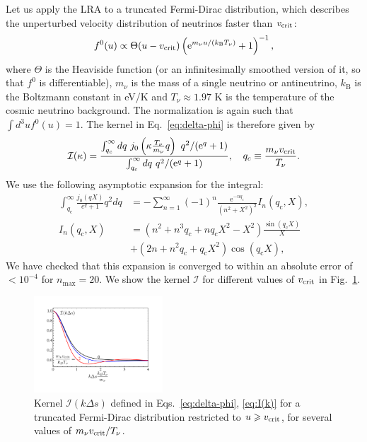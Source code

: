 \documentclass[useAMS, usenatbib]{mnras}
\newcommand{\barr}{\begin{eqnarray}}
\newcommand{\earr}{\end{eqnarray}}
\newcommand{\rme}{\textrm{e}}
\begin{document}
Let us apply the LRA to a truncated Fermi-Dirac distribution, which describes the unperturbed velocity distribution of neutrinos faster than $v_{\rm crit}$:
\begin{equation}
f^0(u) \propto \Theta(u - v_{\rm crit}) \left(\rme^{m_\nu u/ \left(k_\mathrm{B} T_\nu\right)} + 1 \right)^{-1},
\end{equation}
where $\Theta$ is the Heaviside function (or an infinitesimally smoothed version of it, so that $f^0$ is differentiable), $m_\nu$ is the mass of a single neutrino or antineutrino, $k_\mathrm{B}$ is the Boltzmann constant in eV/K and $T_\nu \approx 1.97$ K is the temperature of the cosmic neutrino background. The normalization is again such that $\int d^3 u f^0(u) = 1$. The kernel in Eq.~\eqref{eq:delta-phi} is therefore given by
\barr
\mathcal{I}(\kappa) = \frac{\int_{q_c}^{\infty} dq~ j_0\left(\kappa \frac{T_\nu}{m_\nu}q\right)~ q^2 /(\rme^q + 1) }{\int_{q_c}^{\infty} dq ~q^2/(\rme^q + 1)}, \ \ \ q_c \equiv \frac{m_\nu v_{\rm crit}}{T_\nu}.
\earr
We use the following asymptotic expansion for the integral:
\begin{align}
 \int^\infty_{q_\mathrm{c}} \frac{j_0(qX)}{e^q + 1} q^2 dq &= - \sum^{\infty}_{n=1} (-1)^n \frac{\rme^{-n q_\mathrm{c}}}{(n^2+X^2)^2} I_n(q_\mathrm{c},X),\\
 I_n(q_\mathrm{c},X) &= \left(n^2 + n^3 q_\mathrm{c} + n q_\mathrm{c} X^2 - X^2\right) \frac{\sin(q_\mathrm{c} X)}{X} \nonumber \\
 &+ \left(2n + n^2 q_\mathrm{c} + q_\mathrm{c} X^2\right) \cos(q_\mathrm{c} X),
\end{align}
We have checked that this expansion is converged to within an absolute error of $< 10^{-4}$ for $n_\mathrm{max} = 20$. We show the kernel $\mathcal{I}$ for different values of $v_{\rm crit}$ in Fig.~\ref{fig:kernel}.

\begin{figure}
\includegraphics[width=0.43\textwidth]{nuplots/kernel.pdf}
\caption{Kernel $\mathcal{I}(k \Delta s)$ defined in Eqs.~\eqref{eq:delta-phi}, \eqref{eq:I(k)} for a truncated Fermi-Dirac distribution restricted to $u \geq v_{\rm crit}$, for several values of $m_\nu v_{\rm crit}/T_\nu$. }
\label{fig:kernel}
\end{figure}
\end{document}
